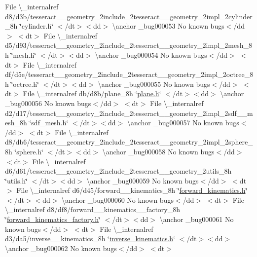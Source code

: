 \begin{DoxyRefList}
\+File \textbackslash{}\+\_\+internalref d8/d3b/tesseract\+\_\+\+\_\+geometry\+\_\+2include\+\_\+2tesseract\+\_\+\+\_\+geometry\+\_\+2impl\+\_\+2cylinder\+\_\+8h \char`\"{}cylinder.\+h\char`\"{} $<$/dt$>$$<$dd$>$ \textbackslash{}anchor \+\_\+bug000053 No known bugs$<$/dd$>$ $<$dt$>$
\+File \textbackslash{}\+\_\+internalref d5/d93/tesseract\+\_\+\+\_\+geometry\+\_\+2include\+\_\+2tesseract\+\_\+\+\_\+geometry\+\_\+2impl\+\_\+2mesh\+\_\+8h \char`\"{}mesh.\+h\char`\"{} $<$/dt$>$$<$dd$>$ \textbackslash{}anchor \+\_\+bug000054 No known bugs$<$/dd$>$ $<$dt$>$
\+File \textbackslash{}\+\_\+internalref df/d5e/tesseract\+\_\+\+\_\+geometry\+\_\+2include\+\_\+2tesseract\+\_\+\+\_\+geometry\+\_\+2impl\+\_\+2octree\+\_\+8h \char`\"{}octree.\+h\char`\"{} $<$/dt$>$$<$dd$>$ \textbackslash{}anchor \+\_\+bug000055 No known bugs$<$/dd$>$ $<$dt$>$
\+File \textbackslash{}\+\_\+internalref db/d8b/plane\+\_\+8h \char`\"{}\mbox{\hyperlink{plane_8h}{plane.\+h}}\char`\"{} $<$/dt$>$$<$dd$>$ \textbackslash{}anchor \+\_\+bug000056 No known bugs$<$/dd$>$ $<$dt$>$
\+File \textbackslash{}\+\_\+internalref d2/d17/tesseract\+\_\+\+\_\+geometry\+\_\+2include\+\_\+2tesseract\+\_\+\+\_\+geometry\+\_\+2impl\+\_\+2sdf\+\_\+\+\_\+mesh\+\_\+8h \char`\"{}sdf\+\_\+mesh.\+h\char`\"{} $<$/dt$>$$<$dd$>$ \textbackslash{}anchor \+\_\+bug000057 No known bugs$<$/dd$>$ $<$dt$>$
\+File \textbackslash{}\+\_\+internalref d8/db6/tesseract\+\_\+\+\_\+geometry\+\_\+2include\+\_\+2tesseract\+\_\+\+\_\+geometry\+\_\+2impl\+\_\+2sphere\+\_\+8h \char`\"{}sphere.\+h\char`\"{} $<$/dt$>$$<$dd$>$ \textbackslash{}anchor \+\_\+bug000058 No known bugs$<$/dd$>$ $<$dt$>$
\+File \textbackslash{}\+\_\+internalref d6/d61/tesseract\+\_\+\+\_\+geometry\+\_\+2include\+\_\+2tesseract\+\_\+\+\_\+geometry\+\_\+2utils\+\_\+8h \char`\"{}utils.\+h\char`\"{} $<$/dt$>$$<$dd$>$ \textbackslash{}anchor \+\_\+bug000059 No known bugs$<$/dd$>$ $<$dt$>$
\+File \textbackslash{}\+\_\+internalref d6/d45/forward\+\_\+\+\_\+kinematics\+\_\+8h \char`\"{}\mbox{\hyperlink{forward__kinematics_8h}{forward\+\_\+kinematics.\+h}}\char`\"{} $<$/dt$>$$<$dd$>$ \textbackslash{}anchor \+\_\+bug000060 No known bugs$<$/dd$>$ $<$dt$>$
\+File \textbackslash{}\+\_\+internalref d8/df8/forward\+\_\+\+\_\+kinematics\+\_\+\+\_\+factory\+\_\+8h \char`\"{}\mbox{\hyperlink{forward__kinematics__factory_8h}{forward\+\_\+kinematics\+\_\+factory.\+h}}\char`\"{} $<$/dt$>$$<$dd$>$ \textbackslash{}anchor \+\_\+bug000061 No known bugs$<$/dd$>$ $<$dt$>$
\+File \textbackslash{}\+\_\+internalref d3/da5/inverse\+\_\+\+\_\+kinematics\+\_\+8h \char`\"{}\mbox{\hyperlink{inverse__kinematics_8h}{inverse\+\_\+kinematics.\+h}}\char`\"{} $<$/dt$>$$<$dd$>$ \textbackslash{}anchor \+\_\+bug000062 No known bugs$<$/dd$>$ $<$dt$>$

\end{DoxyRefList}
